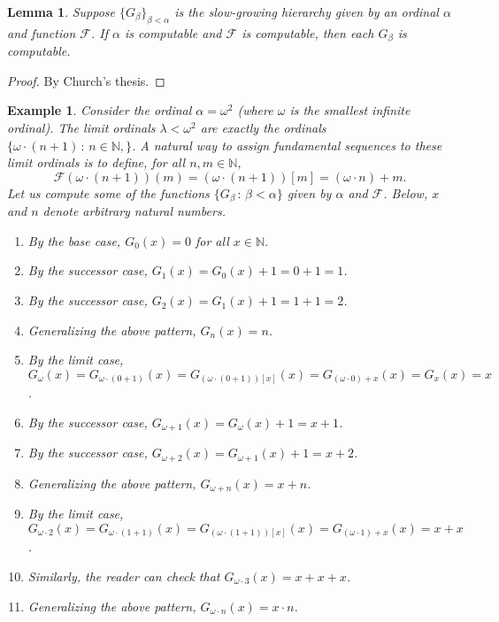 \documentclass{article}
\newtheorem{example}[theorem]{Example}
\newtheorem{lemma}[theorem]{Lemma}
\begin{document}
\begin{lemma}
    Suppose $\{G_\beta\}_{\beta<\alpha}$ is the slow-growing hierarchy given by
    an ordinal $\alpha$ and function $\mathcal F$.
    If $\alpha$ is computable and $\mathcal F$ is computable,
    then each $G_\beta$ is computable.
\end{lemma}

\begin{proof}
By Church's thesis.
\end{proof}

\begin{example}
    Consider the ordinal $\alpha=\omega^2$ (where $\omega$ is the smallest infinite
    ordinal).
    The limit ordinals $\lambda<\omega^2$ are exactly the ordinals
    $\{\omega\cdot (n+1)\,:\,n\in\mathbb N,\}$.
    A natural way to assign fundamental sequences to these limit ordinals is to define,
    for all $n,m\in\mathbb N$,
    \[
        \mathcal F(\omega\cdot(n+1))(m) = (\omega\cdot(n+1))[m] = (\omega\cdot n)+m.
    \]
    Let us compute some of the functions $\{G_{\beta}\,:\,\beta<\alpha\}$
    given by $\alpha$ and $\mathcal F$. Below, $x$ and $n$
    denote arbitrary natural numbers.
    \begin{enumerate}
        \item
        By the base case, $G_0(x)=0$ for all $x\in\mathbb N$.
        \item
        By the successor case, $G_1(x)=G_0(x)+1=0+1=1$.
        \item
        By the successor case, $G_2(x)=G_1(x)+1=1+1=2$.
        \item
        Generalizing the above pattern, $G_n(x)=n$.
        \item
        By the limit case,
        $G_\omega(x)=G_{\omega\cdot(0+1)}(x)
        =G_{(\omega\cdot(0+1))[x]}(x)=G_{(\omega\cdot 0)+x}(x)
        =G_x(x)=x$.
        \item
        By the successor case, $G_{\omega+1}(x)=G_{\omega}(x)+1=x+1$.
        \item
        By the successor case, $G_{\omega+2}(x)=G_{\omega+1}(x)+1=x+2$.
        \item
        Generalizing the above pattern, $G_{\omega+n}(x)=x+n$.
        \item
        By the limit case,
        $G_{\omega\cdot 2}(x)=G_{\omega\cdot(1+1)}(x)
        =G_{(\omega\cdot(1+1))[x]}(x)=G_{(\omega\cdot 1)+x}(x)
        =x+x$.
        \item
        Similarly, the reader can check that $G_{\omega\cdot 3}(x)=x+x+x$.
        \item
        Generalizing the above pattern, $G_{\omega\cdot n}(x)=x\cdot n$.
    \end{enumerate}
\end{example}
\end{document}
